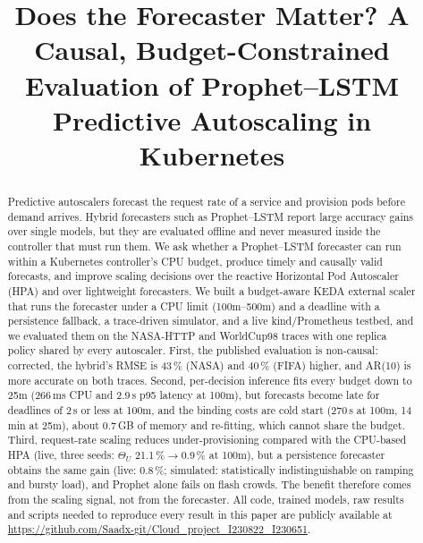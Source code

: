 \documentclass[conference,a4paper]{IEEEtran}
\begin{document}
\title{Does the Forecaster Matter? A Causal, Budget-Constrained Evaluation of Prophet--LSTM Predictive
Autoscaling in Kubernetes}
\author{
\and
{}
\and
{}
}
\maketitle

\begin{abstract}
Predictive autoscalers forecast the request rate of a service and provision pods before demand arrives.
Hybrid forecasters such as Prophet--LSTM report large accuracy gains over single models, but they are evaluated
offline and never measured inside the controller that must run them. We ask whether a Prophet--LSTM forecaster
can run within a Kubernetes controller's CPU budget, produce timely and causally valid forecasts, and improve
scaling decisions over the reactive Horizontal Pod Autoscaler (HPA) and over lightweight forecasters. We built a
budget-aware KEDA external scaler that runs the forecaster under a CPU limit (100m--500m) and a deadline with a
persistence fallback, a trace-driven simulator, and a live kind/Prometheus testbed, and we evaluated them on the
NASA-HTTP and WorldCup98 traces with one replica policy shared by every autoscaler.
First, the published evaluation is non-causal: corrected, the hybrid's RMSE is 43\,\% (NASA) and 40\,\% (FIFA)
higher, and AR(10) is more accurate on both traces. Second, per-decision inference fits every budget down to 25m (266\,ms CPU
and 2.9\,s p95 latency at 100m), but forecasts become late for deadlines of 2\,s or less at 100m, and the binding
costs are cold start (270\,s at 100m, 14\,min at 25m), about 0.7\,GB of memory and re-fitting, which cannot share
the budget.
Third, request-rate scaling reduces under-provisioning compared with the CPU-based HPA (live, three seeds: $\Theta_U$
21.1\,\%$\to$0.9\,\% at 100m), but a persistence forecaster obtains the same gain (live: 0.8\,\%; simulated:
statistically indistinguishable on ramping and bursty load), and Prophet alone fails on flash crowds. The benefit therefore comes from the scaling signal, not from
the forecaster.
All code, trained models, raw results and scripts needed to reproduce every result in this paper are publicly available at \url{https://github.com/Saadx-git/Cloud_project_I230822_I230651}.
\end{abstract}
\end{document}
